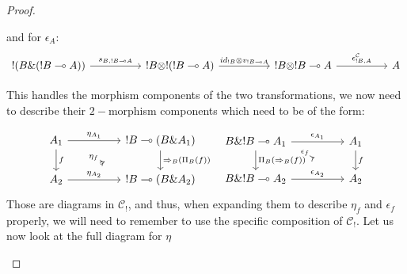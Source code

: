 \documentclass[a4paper, 12pt, twoside,openright]{report}
\newtheorem{definition}{Definition}
\begin{document}
\begin{proof}
\begin{itemize}
and for $\epsilon_A :$
$$
\begin{tikzcd}
!(B \& (!B \multimap A))
\arrow{rr}{s_{B,!B \multimap A}}
&&
!B \otimes !(!B \multimap A)
\arrow{rr}{id_{!B} \otimes v_{!B\multimap A}}
&&
!B \otimes !B \multimap A
\arrow{rr}{\epsilon^{\mathcal{C}}_{!B,A}}
&&
A
\end{tikzcd}$$

This handles the morphism components of the two transformations, we now need to describe their $2-$morphism components which need to be of the form:

$$\begin{tikzcd}
A_1
\arrow{rr}{\eta_{A_1}}
\arrow{d}{f}
&&
!B \multimap (B \& A_1)
\arrow{d}{\Rightarrow_B ( \Pi_B(f))}
\\
A_2
\arrow{rr}{\eta_{A_2}}
\arrow[Rightarrow, shorten >=1.0cm, shorten <=1.1cm]{rru}{\eta_f}
&&
!B \multimap (B \& A_2)
\end{tikzcd}~~
\begin{tikzcd}
B \& !B \multimap A_1
\arrow{rr}{\epsilon_{A_1}}
\arrow{d}{\Pi_B(\Rightarrow_B(f))}
&&
A_1
\arrow{d}{ f}
\\
B \& !B \multimap A_2
\arrow{rr}{\epsilon_{A_2}}
\arrow[Rightarrow, shorten >=1.0cm, shorten <=1.1cm]{rru}{\epsilon_f}
&&
A_2
\end{tikzcd}$$
Those are diagrams in $\mathcal{C}_{!}$, and thus, when expanding them to describe $\eta_f$ and $\epsilon_f$ properly, we will need to remember to use the specific composition of $\mathcal{C}_{!}$.
Let us now look at the full diagram for $\eta$ 
\end{itemize}
\end{proof}
%
\end{document}
